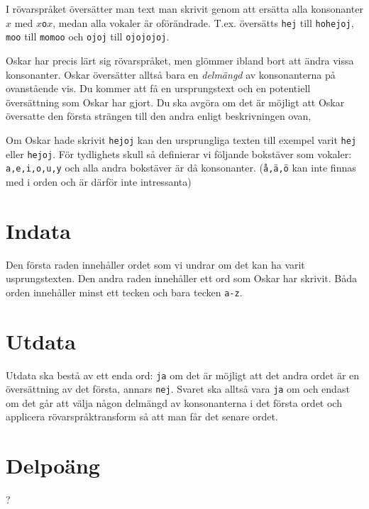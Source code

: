 I rövarspråket översätter man text man skrivit genom att ersätta alla konsonanter $x$ med $x$\texttt{o}$x$, medan alla vokaler är oförändrade. T.ex. översätts \texttt{hej} till \texttt{hohejoj}, \texttt{moo} till \texttt{momoo} och \texttt{ojoj} till \texttt{ojojojoj}.

Oskar har precis lärt sig rövarspråket, men glömmer ibland bort att ändra vissa konsonanter. Oskar översätter alltså bara en \emph{delmängd} av konsonanterna på ovanstående vis. Du kommer att få en ursprungstext och en potentiell översättning som Oskar har gjort. Du ska avgöra om det är möjligt att Oskar översatte den första strängen till den andra enligt beskrivningen ovan,

Om Oskar hade skrivit \texttt{hejoj} kan den ursprungliga texten till exempel varit \texttt{hej} eller \texttt{hejoj}. För tydlighets skull så definierar vi följande bokstäver som vokaler: \texttt{a,e,i,o,u,y} och alla andra bokstäver är då konsonanter. (\texttt{å,ä,ö} kan inte finnas med i orden och är därför inte intressanta)

\section*{Indata}
Den första raden innehåller ordet som vi undrar om det kan ha varit usprungstexten. Den andra raden innehåller ett ord som Oskar har skrivit. Båda orden innehåller minst ett tecken och bara tecken \texttt{a-z}.

\section*{Utdata}
Utdata ska bestå av ett enda ord: \texttt{ja} om det är möjligt att det andra ordet är en översättning av det första, annars \texttt{nej}. Svaret ska alltså vara \texttt{ja} om och endast om det går att välja någon delmängd av konsonanterna i det första ordet och applicera rövarspråktransform så att man får det senare ordet.

\section*{Delpoäng}
?
